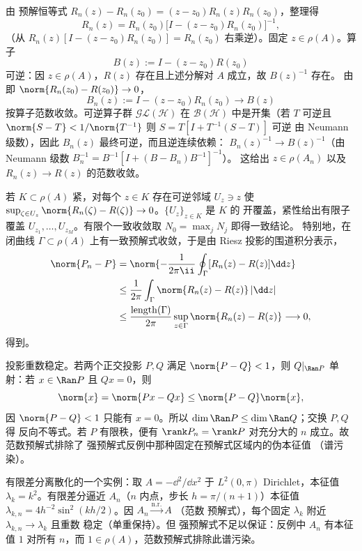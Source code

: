 由 预解恒等式 $R_n(z)-R_n(z_0)=(z-z_0)R_n(z)R_n(z_0)$，整理得
\[
 R_n(z)=R_n(z_0)
 \bigl[I-(z-z_0)R_n(z_0)\bigr]^{-1},
\]
（从 $R_n(z)[I-(z-z_0)R_n(z_0)]=R_n(z_0)$ 右乘逆）。固定 $z\in\rho(A)$。算子
\[
 B(z):=I-(z-z_0)R(z_0)
\]
可逆：因 $z\in\rho(A)$，$R(z)$ 存在且上述分解对 $A$ 成立，故 $B(z)^{-1}$ 存在。
由 即 $\norm{R_n(z_0)-R(z_0)}\to0$，
\[
 B_n(z):=I-(z-z_0)R_n(z_0)
 \to B(z)
\]
按算子范数收敛。可逆算子群 $\mathcal G\mathcal L(\mathcal H)$ 在 $\mathcal B(\mathcal H)$
中是开集（若 $T$ 可逆且 $\norm{S-T}<1/\norm{T^{-1}}$ 则 $S=T[I+T^{-1}(S-T)]$ 可逆
由 Neumann 级数），因此 $B_n(z)$ 最终可逆，而且逆连续依赖：
$B_n(z)^{-1}\to B(z)^{-1}$（由 Neumann 级数 $B_n^{-1}=B^{-1}[I+(B-B_n)B^{-1}]^{-1}$）。
这给出 $z\in\rho(A_n)$ 以及 $R_n(z)\to R(z)$ 的范数收敛。

若 $K\subset\rho(A)$ 紧，对每个 $z\in K$ 存在可逆邻域 $U_z\ni z$ 使
$\sup_{\zeta\in U_z}\norm{R_n(\zeta)-R(\zeta)}\to0$。$\{U_z\}_{z\in K}$ 是 $K$ 的
开覆盖，紧性给出有限子覆盖 $U_{z_1},\ldots,U_{z_M}$。有限个一致收敛取
$N_0=\max_jN_j$ 即得一致结论。
特别地，在闭曲线 $\Gamma\subset\rho(A)$ 上有一致预解式收敛，于是由
Riesz 投影的围道积分表示，
\[
 \begin{aligned}
 \norm{P_n-P}
 &=\norm{-\frac1{2\pi\ii}\oint_\Gamma[R_n(z)-R(z)]\dd z}\\
 &\le\frac{1}{2\pi}\int_\Gamma\norm{R_n(z)-R(z)}\,|\dd z|\\
 &\le\frac{\operatorname{length}(\Gamma)}{2\pi}
 \sup_{z\in\Gamma}\norm{R_n(z)-R(z)}
 \longrightarrow0,
 \end{aligned}
\]
得到。

投影重数稳定。若两个正交投影 $P,Q$ 满足 $\norm{P-Q}<1$，则
$Q|_{\Ran P}$ 单射：若 $x\in\Ran P$ 且 $Qx=0$，则
\[
 \norm{x}=\norm{Px-Qx}\le\norm{P-Q}\norm{x},
\]
因 $\norm{P-Q}<1$ 只能有 $x=0$。所以 $\dim\Ran P\le\dim\Ran Q$；交换 $P,Q$ 得
反向不等式。若 $P$ 有限秩，便有 $\rank P_n=\rank P$ 对充分大的 $n$ 成立。故
范数预解式排除了 强预解式反例中那种固定在预解式区域内的伪本征值
（谱污染）。

有限差分离散化的一个实例：取 $A=-\dd^2/\dd x^2$ 于 $L^2(0,\pi)$ Dirichlet，本征值
$\lambda_k=k^2$。有限差分逼近 $A_n$（$n$ 内点，步长 $h=\pi/(n+1)$）本征值
$\lambda_{k,n}=4h^{-2}\sin^2(kh/2)$。因 $A_n\xrightarrow{\mathrm{n.r.}}A$
（范数 预解式），每个固定 $\lambda_k$ 附近 $\lambda_{k,n}\to\lambda_k$ 且重数
稳定（单重保持）。但 强预解式不足以保证：反例中 $A_n$ 有本征值 $1$ 对所有
$n$，而 $1\in\rho(A)$，范数预解式排除此谱污染。

